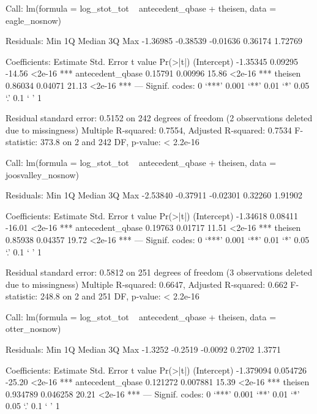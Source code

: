 \documentclass[12pt]{article}
\begin{document}
\begin{Schunk}
\begin{Soutput}
Call:
lm(formula = log_stot_tot ~ antecedent_qbase + theisen, data = eagle_nosnow)

Residuals:
     Min       1Q   Median       3Q      Max 
-1.36985 -0.38539 -0.01636  0.36174  1.72769 

Coefficients:
                 Estimate Std. Error t value Pr(>|t|)    
(Intercept)      -1.35345    0.09295  -14.56   <2e-16 ***
antecedent_qbase  0.15791    0.00996   15.86   <2e-16 ***
theisen           0.86034    0.04071   21.13   <2e-16 ***
---
Signif. codes:  0 ‘***’ 0.001 ‘**’ 0.01 ‘*’ 0.05 ‘.’ 0.1 ‘ ’ 1 

Residual standard error: 0.5152 on 242 degrees of freedom
  (2 observations deleted due to missingness)
Multiple R-squared: 0.7554,	Adjusted R-squared: 0.7534 
F-statistic: 373.8 on 2 and 242 DF,  p-value: < 2.2e-16 
\end{Soutput}
\begin{Soutput}
Call:
lm(formula = log_stot_tot ~ antecedent_qbase + theisen, data = joosvalley_nosnow)

Residuals:
     Min       1Q   Median       3Q      Max 
-2.53840 -0.37911 -0.02301  0.32260  1.91902 

Coefficients:
                 Estimate Std. Error t value Pr(>|t|)    
(Intercept)      -1.34618    0.08411  -16.01   <2e-16 ***
antecedent_qbase  0.19763    0.01717   11.51   <2e-16 ***
theisen           0.85938    0.04357   19.72   <2e-16 ***
---
Signif. codes:  0 ‘***’ 0.001 ‘**’ 0.01 ‘*’ 0.05 ‘.’ 0.1 ‘ ’ 1 

Residual standard error: 0.5812 on 251 degrees of freedom
  (3 observations deleted due to missingness)
Multiple R-squared: 0.6647,	Adjusted R-squared: 0.662 
F-statistic: 248.8 on 2 and 251 DF,  p-value: < 2.2e-16 
\end{Soutput}
\begin{Soutput}
Call:
lm(formula = log_stot_tot ~ antecedent_qbase + theisen, data = otter_nosnow)

Residuals:
    Min      1Q  Median      3Q     Max 
-1.3252 -0.2519 -0.0092  0.2702  1.3771 

Coefficients:
                  Estimate Std. Error t value Pr(>|t|)    
(Intercept)      -1.379094   0.054726  -25.20   <2e-16 ***
antecedent_qbase  0.121272   0.007881   15.39   <2e-16 ***
theisen           0.934789   0.046258   20.21   <2e-16 ***
---
Signif. codes:  0 ‘***’ 0.001 ‘**’ 0.01 ‘*’ 0.05 ‘.’ 0.1 ‘ ’ 1 


\end{Soutput}
\end{Schunk}
\end{document}
